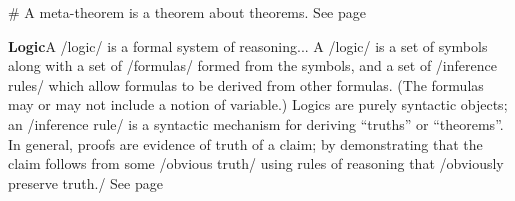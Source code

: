 \documentclass[11pt]{article}
\begin{document}
 # A meta-theorem is a theorem about theorems. See page \pageref{org-special-block-extras-glossary-declaration-site-Theorem}

\vspace{1em}\textbf{Logic}\quad\label{org-special-block-extras-glossary-Logic}A /logic/ is a formal system of reasoning...  A /logic/ is a set of symbols along with a set of /formulas/ formed from the symbols, and a set of /inference rules/ which allow formulas to be derived from other formulas. (The formulas may or may not include a notion of variable.)  Logics are purely syntactic objects; an /inference rule/ is a syntactic mechanism for deriving “truths” or “theorems”.  In general, proofs are evidence of truth of a claim; by demonstrating that the claim follows from some /obvious truth/ using rules of reasoning that /obviously preserve truth./ See page \pageref{org-special-block-extras-glossary-declaration-site-Logic}
\end{document}
